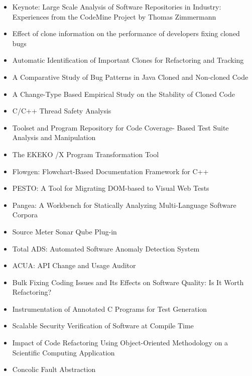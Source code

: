 {\small
\begin{itemize}[itemsep=-1ex]
  \item Keynote: Large Scale Analysis of Software Repositories in Industry: Experiences from the CodeMine Project by Thomas Zimmermann
  \item Effect of clone information on the performance of developers fixing cloned bugs
  \item Automatic Identification of Important Clones for Refactoring and Tracking
  \item A Comparative Study of Bug Patterns in Java Cloned and Non-cloned Code {\color{blue} \checkmark}{\color{red} \texttimes}
  \item A Change-Type Based Empirical Study on the Stability of Cloned Code
  \item C/C++ Thread Safety Analysis {\color{blue} \checkmark}{\color{red} \texttimes}
  \item Toolset and Program Repository for Code Coverage- Based Test Suite Analysis and Manipulation
  \item The EKEKO /X Program Transformation Tool {\color{blue} \checkmark}{\color{red} \texttimes}
  \item Flowgen: Flowchart-Based Documentation Framework for C++ {\color{blue} \checkmark}{\color{red} \texttimes}
  \item PESTO: A Tool for Migrating DOM-based to Visual Web Tests {\color{blue} \checkmark}{\color{red} \texttimes}
  \item Pangea: A Workbench for Statically Analyzing Multi-Language Software Corpora {\color{blue} \checkmark}{\color{red} \texttimes}
  \item Source Meter Sonar Qube Plug-in {\color{blue} \checkmark}{\color{blue} \checkmark}
  \item Total ADS: Automated Software Anomaly Detection System
  \item ACUA: API Change and Usage Auditor
  \item Bulk Fixing Coding Issues and Its Effects on Software Quality: Is It Worth Refactoring?
  \item Instrumentation of Annotated C Programs for Test Generation
  \item Scalable Security Verification of Software at Compile Time {\color{blue} \checkmark}{\color{red} \texttimes}
  \item Impact of Code Refactoring Using Object-Oriented Methodology on a Scientific Computing Application
  \item Concolic Fault Abstraction {\color{blue} \checkmark}{\color{red} \texttimes}

\end{itemize}}
